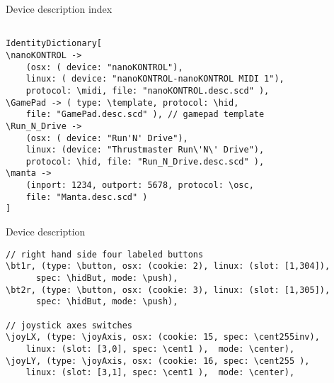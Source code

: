\documentclass[pdf,slideColor,colorBG,accumulate,total]{prosper}
\begin{document}
\begin{slide}{Device description index}

\footnotesize
\begin{verbatim}

IdentityDictionary[
\nanoKONTROL -> 
	(osx: ( device: "nanoKONTROL"), 
	linux: ( device: "nanoKONTROL-nanoKONTROL MIDI 1"), 
	protocol: \midi, file: "nanoKONTROL.desc.scd" ),
\GamePad -> ( type: \template, protocol: \hid, 
	file: "GamePad.desc.scd" ), // gamepad template
\Run_N_Drive -> 
	(osx: ( device: "Run'N' Drive"),
	linux: (device: "Thrustmaster Run\'N\' Drive"), 
	protocol: \hid, file: "Run_N_Drive.desc.scd" ),
\manta -> 
	(inport: 1234, outport: 5678, protocol: \osc,
	file: "Manta.desc.scd" )
] 
\end{verbatim}
\end{slide}

\begin{slide}{Device description}

\footnotesize
\begin{verbatim}
// right hand side four labeled buttons
\bt1r, (type: \button, osx: (cookie: 2), linux: (slot: [1,304]),
	  spec: \hidBut, mode: \push), 
\bt2r, (type: \button, osx: (cookie: 3), linux: (slot: [1,305]),
	  spec: \hidBut, mode: \push), 
	
// joystick axes switches
\joyLX, (type: \joyAxis, osx: (cookie: 15, spec: \cent255inv), 
    linux: (slot: [3,0], spec: \cent1 ),  mode: \center), 
\joyLY, (type: \joyAxis, osx: (cookie: 16, spec: \cent255 ), 
    linux: (slot: [3,1], spec: \cent1 ),  mode: \center), 
\end{verbatim}


 
\end{slide}

\end{document}
